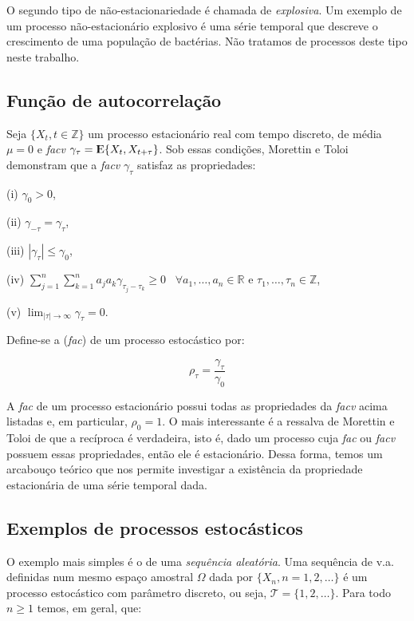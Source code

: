 O segundo tipo de não-estacionariedade é chamada de \emph{explosiva}. Um exemplo de um processo não-estacionário explosivo é uma série temporal que descreve o crescimento de uma população de bactérias. Não tratamos de processos deste tipo neste trabalho.

\subsection{Função de autocorrelação}

Seja $\{ X_t, t \in \mathbb{Z} \}$ um processo estacionário real com tempo discreto, de média $\mu = 0$ e \emph{facv} $\gamma_\tau = {\rm I\kern-.3em E}\{ X_t, X_{t+\tau} \}$. Sob essas condições, Morettin e Toloi \citep{morettin} demonstram que a \emph{facv} $\gamma_\tau$ satisfaz as propriedades:

	(i) $\gamma_0 > 0$,

	(ii) $\gamma_{-\tau} = \gamma_\tau$,

	(iii) $|\gamma_\tau| \leq \gamma_0$,

	(iv) $\sum_{j=1}^n \sum_{k=1}^n a_j a_k \gamma_{\tau_j - \tau_k} \geq 0 \;\;\; \forall a_1, \ldots, a_n \in \mathbb{R}$ e $\tau_1, \ldots, \tau_n \in \mathbb{Z}$,

	(v) $\lim_{|\tau| \to \infty}  \gamma_\tau = 0$.

Define-se a  (\emph{fac}) de um processo estocástico por:

\begin{equation}\label{series:2.14}
\rho_\tau = \frac{\gamma_\tau}{\gamma_0}
\end{equation}

A \emph{fac} de um processo estacionário possui todas as propriedades da \emph{facv} acima listadas e, em particular, $\rho_0 = 1$. O mais interessante é a ressalva de Morettin e Toloi \citep{morettin} de que a recíproca é verdadeira, isto é, dado um processo cuja \emph{fac} ou \emph{facv} possuem essas propriedades, então ele é estacionário. Dessa forma, temos um arcabouço teórico que nos permite investigar a existência da propriedade estacionária de uma série temporal dada.

\subsection{Exemplos de processos estocásticos}

O exemplo mais simples é o de uma \emph{sequência aleatória}. Uma sequência de v.a. definidas num mesmo espaço amostral $\Omega$ dada por $\{ X_n , n = 1, 2, \ldots \}$ é um processo estocástico com parâmetro discreto, ou seja, $\mathcal{T} = \{ 1, 2, \ldots \}$. Para todo $n \geq 1$ temos, em geral, que:

